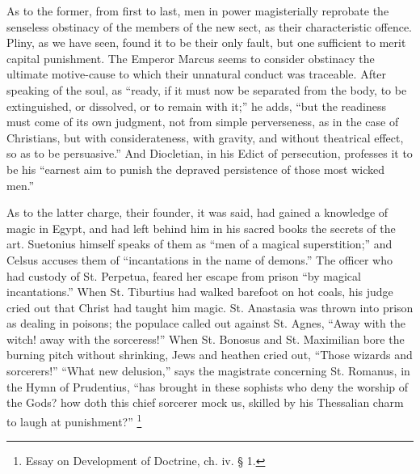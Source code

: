 As to the former, from first to last, men in power magisterially
reprobate the senseless obstinacy of the members of the new sect, as
their characteristic offence. Pliny, as we have seen, found it to be
their only fault, but one sufficient to merit capital punishment. The
Emperor Marcus seems to consider obstinacy the ultimate motive-cause
to which their unnatural conduct was traceable. After speaking of the
soul, as ``ready, if it must now be separated from the body, to be
extinguished, or dissolved, or to remain with it;'' he adds,
``but the readiness must come of its own judgment, not from simple
perverseness, as in the case of Christians, but with considerateness,
with gravity, and without theatrical effect, so as to be
persuasive.'' And Diocletian, in his Edict of persecution,
professes it to be his ``earnest aim to punish the depraved
persistence of those most wicked men.''

As to the latter charge, their founder, it was said, had gained a
knowledge of magic in Egypt, and had left behind him in his sacred
books the secrets of the art. Suetonius himself speaks of them as
``men of a magical superstition;'' and Celsus accuses them of
``incantations in the name of demons.'' The officer who had
custody of St. Perpetua, feared her escape from prison ``by
magical incantations.'' When St. Tiburtius had walked barefoot on
hot coals, his judge cried out that Christ had taught him magic. St.
Anastasia was thrown into prison as dealing in poisons; the populace
called out against St. Agnes, ``Away with the witch! away with the
sorceress!'' When St. Bonosus and St. Maximilian bore the burning
pitch without shrinking, Jews and heathen cried out, ``Those
wizards and sorcerers!'' ``What new delusion,'' says the
magistrate concerning St. Romanus, in the Hymn of Prudentius,
``has brought in these sophists who deny the worship of the Gods?
how doth this chief sorcerer mock us, skilled by his Thessalian charm
to laugh at punishment?'' \footnote{Essay on
Development of Doctrine, ch. iv. § 1.}

